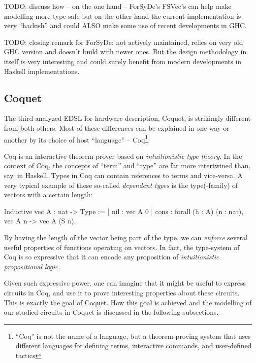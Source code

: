 \documentclass[a4paper]{article}
\begin{document}
                TODO: discuss how -- on the one hand -- ForSyDe's FSVec's can help make modelling
                more type safe but on the other hand the current implementation is very ``hackish''
                and could ALSO make some use of recent developments in GHC.


                TODO: closing remark for ForSyDe: not actively maintained, relies on very old GHC
                version and doesn't build with newer ones. But the design methodology in itself is
                very interesting and could surely benefit from modern developments in Haskell
                implementations.

        \subsection{Coquet}
        \label{subsec:coquet}
            The third analyzed EDSL for hardware description, Coquet\cite{coquet2011},
            is strikingly different from both others. Most of these differences can be explained in
            one way or another by its choice of host ``language'' -- Coq\footnote{``Coq'' is not
                the name of a language, but a theorem-proving system that uses different languages
                for defining terms, interactive commands, and user-defined tactics}.

            Coq is an interactive theorem prover based on \emph{intuitionistic type theory}. In the
            context of Coq, the concepts of ``term'' and ``type'' are far more intertwined than,
            say, in Haskell. Types in Coq can contain references to terms and vice-versa. A very
            typical example of these so-called \emph{dependent types} is the type(-family) of
            vectors with a certain length:
            \begin{coqcode}
        Inductive vec A : nat -> Type :=
            | nil  : vec A 0
            | cons : forall (h : A) (n : nat),  vec A n -> vec A (S n).
            \end{coqcode}

            By having the length of the vector being part of the type, we can \emph{enforce} several
            useful properties of functions operating on vectors. In fact, the type-system of Coq is
            so expressive that it can encode any proposition of \emph{intuitionistic propositional
                logic}.

            Given such expressive power, one can imagine that it might be useful to express circuits
            in Coq, and use it to prove interesting properties about these circuits. This is exactly
            the goal of Coquet. How this goal is achieved and the modelling of our studied circuits
            in Coquet is discussed in the following subsections.
\end{document}
